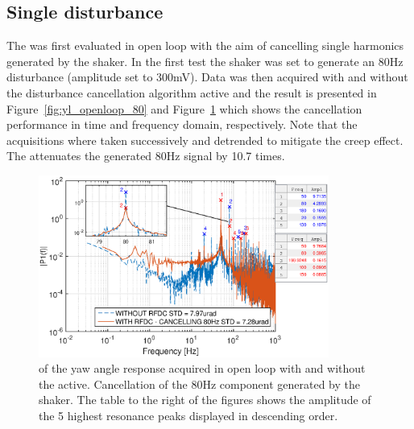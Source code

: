 \subsection{Single disturbance}
The \abbrRFDC was first evaluated in open loop with the aim of cancelling single harmonics generated by the shaker. In the first test the shaker was set to generate an 80Hz disturbance (amplitude set to 300mV). Data was then acquired with and without the disturbance cancellation algorithm active and the result is presented in Figure~\ref{fig:yl_openloop_80} and Figure~\ref{fig:fft_openloop_80} which shows the cancellation performance in time and frequency domain, respectively. Note that the acquisitions where taken successively and detrended to mitigate the creep effect. The \abbrRFDC attenuates the generated 80Hz signal by 10.7 times.

\begin{figure}[h!]
  \centering %
  \includegraphics[width=0.85\textwidth, trim=0cm 0cm 0cm 0cm, clip=true]{fig/matlab/fft_openloop_ext_disturbance_80Hz_with_zoom}
  \caption{\label{fig:fft_openloop_80} \abbrFFT of the yaw angle response acquired in open loop with and without the \abbrRFDC active. Cancellation of the 80Hz component generated by the shaker. The table to the right of the figures shows the amplitude of the 5 highest resonance peaks displayed in descending order.}
\end{figure}

